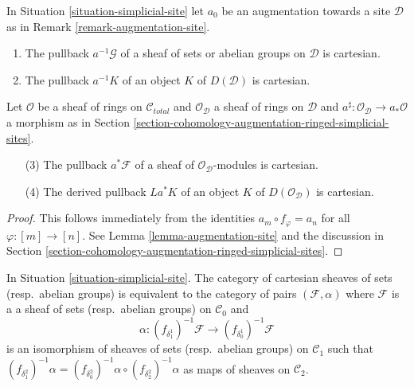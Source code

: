 \begin{lemma}
\label{lemma-augmentation-cartesian-module}
In Situation \ref{situation-simplicial-site} let
$a_0$ be an augmentation towards a site $\mathcal{D}$ as in
Remark \ref{remark-augmentation-site}.
\begin{enumerate}
\item The pullback $a^{-1}\mathcal{G}$ of a sheaf of sets or abelian groups
on $\mathcal{D}$ is cartesian.
\item The pullback $a^{-1}K$ of an object $K$ of $D(\mathcal{D})$
is cartesian.
\end{enumerate}
Let $\mathcal{O}$ be a sheaf of rings on $\mathcal{C}_{total}$ and
$\mathcal{O}_\mathcal{D}$ a sheaf of rings on $\mathcal{D}$
and $a^\sharp : \mathcal{O}_\mathcal{D} \to a_*\mathcal{O}$ a
morphism as in
Section \ref{section-cohomology-augmentation-ringed-simplicial-sites}.
\begin{enumerate}
\item[(3)] The pullback $a^*\mathcal{F}$ of a sheaf of
$\mathcal{O}_\mathcal{D}$-modules is cartesian.
\item[(4)] The derived pullback $La^*K$ of an object
$K$ of $D(\mathcal{O}_\mathcal{D})$ is cartesian.
\end{enumerate}
\end{lemma}

\begin{proof}
This follows immediately from the identities
$a_m \circ f_\varphi = a_n$ for all $\varphi : [m] \to [n]$.
See Lemma \ref{lemma-augmentation-site} and the discussion in
Section \ref{section-cohomology-augmentation-ringed-simplicial-sites}.
\end{proof}

\begin{lemma}
\label{lemma-characterize-cartesian}
In Situation \ref{situation-simplicial-site}.
The category of cartesian sheaves of sets (resp.\ abelian groups)
is equivalent to the category of pairs $(\mathcal{F}, \alpha)$
where $\mathcal{F}$ is a a sheaf of sets (resp.\ abelian groups)
on $\mathcal{C}_0$ and
$$
\alpha :
(f_{\delta_1^1})^{-1}\mathcal{F}
\longrightarrow (f_{\delta_0^1})^{-1}\mathcal{F}
$$
is an isomorphism of sheaves of sets (resp.\ abelian groups)
on $\mathcal{C}_1$ such that
$(f_{\delta^2_1})^{-1}\alpha =
(f_{\delta^2_0})^{-1}\alpha \circ (f_{\delta^2_2})^{-1}\alpha$
as maps of sheaves on $\mathcal{C}_2$.
\end{lemma}

